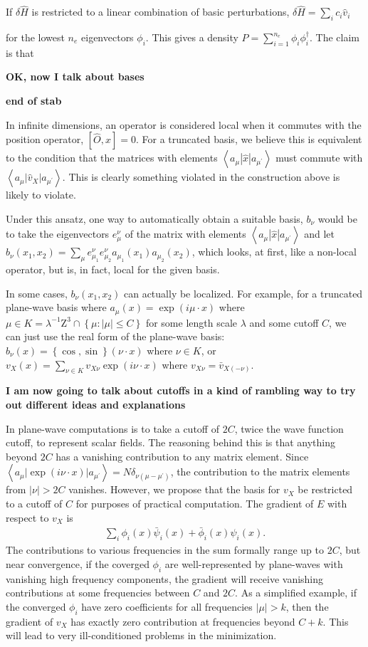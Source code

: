 \documentclass{article}
\newcommand{\beas}{\begin{eqnarray*}}
\newcommand{\enas}{\end{eqnarray*}}
\newcommand{\integers}{\mbox{Z}}
\newcommand{\bparen}[1]{\left\{{#1}\right\}}
\newcommand{\brparen}[1]{\left[{#1}\right]}
\newcommand{\inp}[1]{\left<{#1}\right>}
\begin{document}
If $\delta \hat{H}$ is restricted to a linear combination of
basic perturbations, $\delta \hat{H} = \sum_i c_i \hat{v}_i$

for the lowest $n_e$ eigenvectors $\phi_i$.  This gives a density
$P = \sum_{i=1}^{n_e} \phi_i \phi_i^\dagger$.  The claim is that

{\bf OK, now I talk about bases}

{\bf end of stab}



In infinite dimensions, an operator is considered local when it
commutes with the position operator, $\brparen{ \hat{O}, \hat{x} } = 0$.
For a truncated basis, we believe this is equivalent to the
condition that the matrices with
elements $\inp{ a_{\mu} \left| \hat{x} \right| a_{\mu^\prime }}$
must commute with
$\inp{ a_{\mu} \left| \hat{v}_X \right| a_{\mu^\prime} }$.
This is clearly something violated in the construction above
is likely to violate.

Under this ansatz, one way to automatically obtain a suitable basis,
$b_\nu$ would be to take the eigenvectors $e^\nu_\mu$ of the matrix
with elements $\inp{ a_{\mu} \left| \hat{x} \right| a_{\mu^\prime }}$
and let
$b_{\nu}(x_1,x_2)=
\sum_\mu e^\nu_{\mu_1} e^\nu_{\mu_2} a_{\mu_1}(x_1) a_{\mu_2}(x_2)$,
which looks, at first, like a non-local operator, but is, in fact,
local for the given basis.

In some cases, $b_\nu(x_1,x_2)$ can actually be localized.  For example,
for a truncated plane-wave basis where $a_{\mu}(x) = \exp(i \mu \cdot x)$
where $\mu \in K = \lambda^{-1} \integers^3 \cap \bparen{ \mu : |\mu| \le C }$
for some length scale $\lambda$ and some cutoff $C$,
we can just use the real form of the plane-wave basis:
$b_{\nu}(x) = \bparen{\cos,\sin}(\nu \cdot x)$
where $\nu \in K$, or
$v_X(x) = \sum_{\nu \in K} v_{X \nu} \exp(i \nu \cdot x)$
where $v_{X \nu} = \bar{v}_{X (-\nu)}$.

{\bf I am now going to talk about cutoffs in a kind of rambling way
to try out different ideas and explanations}

In plane-wave computations is to take a cutoff of $2C$, twice the wave
function cutoff, to represent scalar fields.  The reasoning behind this is
that anything beyond $2C$ has a vanishing contribution to any matrix
element.  Since
$\inp{ a_{\mu} \left| \exp(i \nu \cdot x) \right| a_{\mu^\prime }}
 = N \delta_{\nu (\mu - \mu^\prime)}$, the contribution to
the matrix elements from $|\nu| > 2C$ vanishes.  However, we propose
that the basis for $v_X$ be restricted to a cutoff of $C$ for
purposes of practical computation.
The gradient of $E$ with respect to $v_X$ is
\beas
  \sum_i \phi_i(x) \bar{\psi}_i(x) + \bar{\phi}_i(x) \psi_i(x).
\enas
The contributions to various frequencies in the sum formally
range up to $2C$, but near convergence, if the coverged $\phi_i$ are
well-represented by plane-waves with vanishing high frequency
components, the gradient will receive vanishing contributions
at some frequencies between $C$ and $2C$.  As a simplified example,
if the converged $\phi_i$ have zero coefficients for all frequencies
$|\mu|> k$, then the gradient of $v_X$ has exactly zero contribution
at frequencies beyond $C+k$.  This will lead to very ill-conditioned
problems in the minimization.
\end{document}
